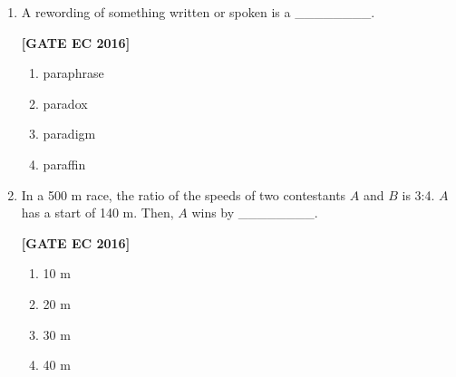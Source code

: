 \documentclass[12pt]{article}
\begin{document}
\begin{enumerate}[label=\textbf{Q.\arabic*.}, start=1, itemsep=2em]
\item A rewording of something written or spoken is a \_\_\_\_\_\_\_\_.

\noindent \textbf{[GATE EC 2016]}

\begin{multicols}{2}
\begin{enumerate}[label=\Alph*.]
    \item paraphrase
    \item paradox
    \item paradigm
    \item paraffin
\end{enumerate}
\end{multicols}

\item In a 500 m race, the ratio of the speeds of two contestants $A$ and $B$ is 3:4. $A$ has a start of 140 m. Then, $A$ wins by \_\_\_\_\_\_\_\_.

\noindent \textbf{[GATE EC 2016]}

\begin{multicols}{4}
\begin{enumerate}[label=\Alph*.]
    \item 10 m
    \item 20 m
    \item 30 m
    \item 40 m
\end{enumerate}
\end{multicols}

\end{enumerate}
\end{document}
